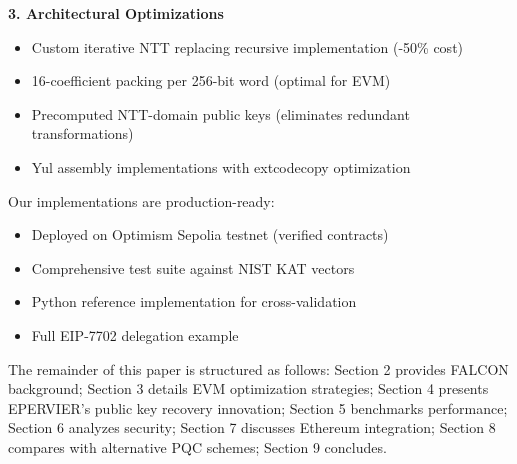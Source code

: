 \textbf{3. Architectural Optimizations}
\begin{itemize}
    \item Custom iterative NTT replacing recursive implementation (-50\% cost)
    \item 16-coefficient packing per 256-bit word (optimal for EVM)
    \item Precomputed NTT-domain public keys (eliminates redundant transformations)
    \item Yul assembly implementations with extcodecopy optimization \cite{grassi2023efficient}
\end{itemize}

Our implementations are production-ready:
\begin{itemize}
    \item Deployed on Optimism Sepolia testnet (verified contracts)
    \item Comprehensive test suite against NIST KAT vectors
    \item Python reference implementation for cross-validation
    \item Full EIP-7702 delegation example
\end{itemize}

The remainder of this paper is structured as follows: Section 2 provides FALCON background; Section 3 details EVM optimization strategies; Section 4 presents EPERVIER's public key recovery innovation; Section 5 benchmarks performance; Section 6 analyzes security; Section 7 discusses Ethereum integration; Section 8 compares with alternative PQC schemes; Section 9 concludes.

